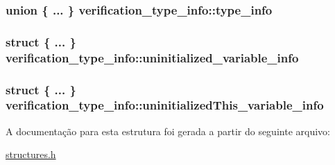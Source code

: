 \subsubsection[{\texorpdfstring{type\+\_\+info}{type_info}}]{\setlength{\rightskip}{0pt plus 5cm}union \{ ... \}   verification\+\_\+type\+\_\+info\+::type\+\_\+info}\hypertarget{structverification__type__info_a694db81e19f00bd3af2cfa2fca4c81d2}{}\label{structverification__type__info_a694db81e19f00bd3af2cfa2fca4c81d2}
\subsubsection[{\texorpdfstring{uninitialized\+\_\+variable\+\_\+info}{uninitialized_variable_info}}]{\setlength{\rightskip}{0pt plus 5cm}struct \{ ... \}   verification\+\_\+type\+\_\+info\+::uninitialized\+\_\+variable\+\_\+info}\hypertarget{structverification__type__info_a732c79b23b52ddb0f77b5e25360d5253}{}\label{structverification__type__info_a732c79b23b52ddb0f77b5e25360d5253}
\subsubsection[{\texorpdfstring{uninitialized\+This\+\_\+variable\+\_\+info}{uninitializedThis_variable_info}}]{\setlength{\rightskip}{0pt plus 5cm}struct \{ ... \}   verification\+\_\+type\+\_\+info\+::uninitialized\+This\+\_\+variable\+\_\+info}\hypertarget{structverification__type__info_a8b83ff57fc01ffdd4f7761af5ab72885}{}\label{structverification__type__info_a8b83ff57fc01ffdd4f7761af5ab72885}


A documentação para esta estrutura foi gerada a partir do seguinte arquivo\+:\begin{DoxyCompactItemize}
\item 
\hyperlink{structures_8h}{structures.\+h}\end{DoxyCompactItemize}
